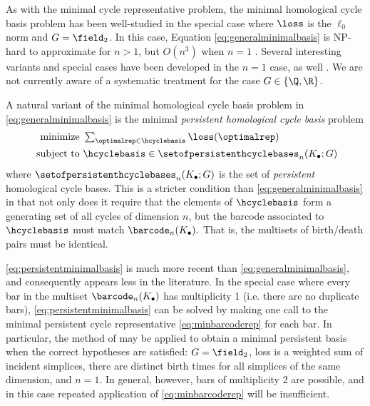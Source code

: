 As with the minimal cycle representative problem, the minimal homological cycle basis problem has been well-studied in the special case where $\loss$ is the $\ell_0$ norm and $G = \field_2$.  In this case, Equation \eqref{eq:generalminimalbasis} is NP-hard to approximate for $n>1$, but  $O(n^3)$ when $n=1$ \cite{dey2018efficient}. Several interesting variants and special cases have been developed in the $n=1$ case, as well \cite{shortestonedimension, erickson2005greedy, chen2010measuring}.  We are not currently aware of a systematic treatment for the case $G \in \{\Q, \R\}$.


A natural variant of the minimal homological cycle basis problem in \eq \eqref{eq:generalminimalbasis} is the minimal \emph{persistent homological cycle basis} problem  %
\begin{align}
   \begin{split}
    \text{minimize } & \textstyle \sum_{\optimalrep \in \hcyclebasis} \loss(\optimalrep) \\
    \text{ subject to } & \hcyclebasis \in \setofpersistenthcyclebases_n(K_\bullet ; G)
   \end{split}
   \label{eq:persistentminimalbasis}
\end{align}
where $\setofpersistenthcyclebases_n(K_\bullet; G)$ is the set of \emph{persistent} homological cycle bases. This is a stricter condition than \pr \eqref{eq:generalminimalbasis} in that not only does it require that the elements of $\hcyclebasis$ form a generating set of all cycles of dimension $n$, but the barcode associated to $\hcyclebasis$ must match $\barcode_n(K_\bullet).$ That is, the multisets of birth/death pairs must be identical.

\pr \eqref{eq:persistentminimalbasis} is much more recent than \pr \eqref{eq:generalminimalbasis}, and consequently appears less in the literature.   In the special case where every bar in the multiset $\barcode_n(K_\bullet)$ has multiplicity 1 (i.e. there are no duplicate bars), \pr \eqref{eq:persistentminimalbasis} can be solved by making one call to the minimal persistent cycle representative \pr \eqref{eq:minbarcoderep} for each bar.   In particular, the method of \cite{chenquantifying} may be applied to obtain a minimal persistent basis when the correct hypotheses are satisfied: $G = \field_2$, loss is a weighted sum of incident simplices, there are distinct birth times for all simplices of the same dimension, and $n=1$. In general, however, bars of multiplicity 2 are possible, and in this case repeated application of \pr \eqref{eq:minbarcoderep} will be insufficient. %

